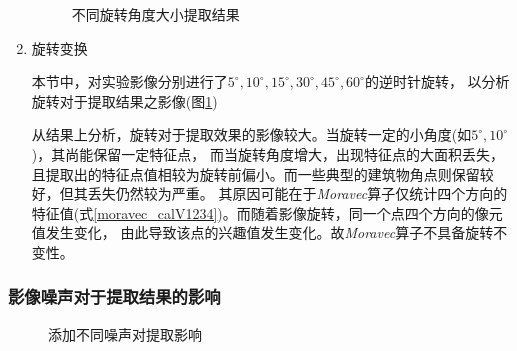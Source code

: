 \begin{enumerate}
            \begin{figure}[H]
                \centering
                \caption{不同旋转角度大小提取结果}
                \label{moravec_rotate}
            \end{figure}

            \item 旋转变换
            
            \hspace{20pt}本节中，对实验影像分别进行了$5^\circ , 10^\circ , 15^\circ , 30^\circ , 45^\circ , 60^\circ$的逆时针旋转，
            以分析旋转对于提取结果之影像(图\ref{moravec_rotate})

            \hspace{20pt}从结果上分析，旋转对于提取效果的影像较大。当旋转一定的小角度(如$5^\circ , 10^\circ$)，其尚能保留一定特征点，
            而当旋转角度增大，出现特征点的大面积丢失，且提取出的特征点值相较为旋转前偏小。而一些典型的建筑物角点则保留较好，但其丢失仍然较为严重。
            其原因可能在于\textit{Moravec}算子仅统计四个方向的特征值(式\ref{moravec_calV1234})。而随着影像旋转，同一个点四个方向的像元值发生变化，
            由此导致该点的兴趣值发生变化。故\textit{Moravec}算子不具备旋转不变性。

        \end{enumerate}


    \subsubsection{影像噪声对于提取结果的影响}
    \begin{figure}[H]
        \centering
        \caption{添加不同噪声对提取影响}
        \label{moravec_noise}
    \end{figure}

